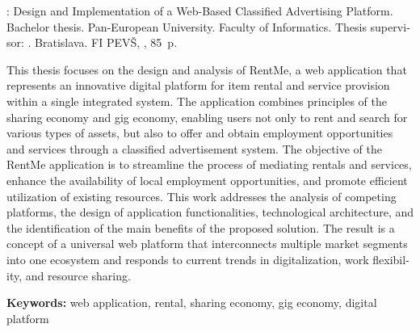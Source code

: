 \begin{otherlanguage}{english}
\noindent\hspace*{1.5em}\MakeUppercase{\@author{}}: Design and Implementation of a Web-Based Classified Advertising Platform. Bachelor thesis. Pan-European University. Faculty of Informatics. Thesis supervisor: \supervisor. Bratislava. FI PEVŠ, \thesisyear, 85~p.\par\vspace{1em}

\noindent\hspace*{1.5em}This thesis focuses on the design and analysis of RentMe, a web application that represents an innovative digital platform for item rental and service provision within a single integrated system. The application combines principles of the sharing economy and gig economy, enabling users not only to rent and search for various types of assets, but also to offer and obtain employment opportunities and services through a classified advertisement system. The objective of the RentMe application is to streamline the process of mediating rentals and services, enhance the availability of local employment opportunities, and promote efficient utilization of existing resources. This work addresses the analysis of competing platforms, the design of application functionalities, technological architecture, and the identification of the main benefits of the proposed solution. The result is a concept of a universal web platform that interconnects multiple market segments into one ecosystem and responds to current trends in digitalization, work flexibility, and resource sharing.\par\vspace{1em}

\noindent\hspace*{1.5em}\textbf{Keywords:} web application, rental, sharing economy, gig economy, digital platform
\end{otherlanguage}

\clearpage
\makeatother
